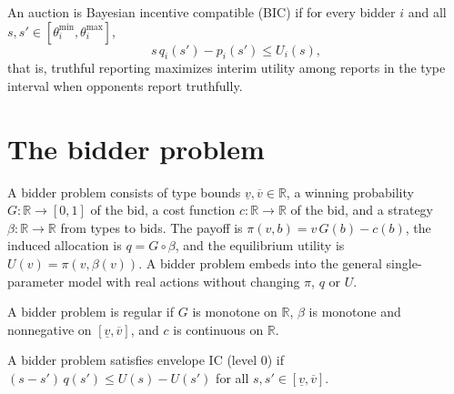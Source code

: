 \begin{definition}\label{def:MathEconLib.Auction.BIC}\leanok
{}
An auction is Bayesian incentive compatible (BIC) if for every bidder $i$ and all $s,s'\in[\theta^{\min}_i,\theta^{\max}_i]$,
\[
s\,q_i(s')-p_i(s')\le U_i(s),
\]
that is, truthful reporting maximizes interim utility among reports in the type interval when opponents report truthfully.
\end{definition}

\section{The bidder problem}

\begin{definition}\label{def:MathEconLib.BidderProblem}\leanok
{}
A bidder problem consists of type bounds $\underline v,\overline v\in\mathbb{R}$, a winning probability $G:\mathbb{R}\to[0,1]$ of the bid, a cost function $c:\mathbb{R}\to\mathbb{R}$ of the bid, and a strategy $\beta:\mathbb{R}\to\mathbb{R}$ from types to bids. The payoff is $\pi(v,b)=v\,G(b)-c(b)$, the induced allocation is $q=G\circ\beta$, and the equilibrium utility is $U(v)=\pi(v,\beta(v))$. A bidder problem embeds into the general single-parameter model with real actions without changing $\pi$, $q$ or $U$.
\end{definition}

\begin{definition}\label{def:MathEconLib.BidderProblem.IsRegular}\leanok
{}
A bidder problem is regular if $G$ is monotone on $\mathbb{R}$, $\beta$ is monotone and nonnegative on $[\underline v,\overline v]$, and $c$ is continuous on $\mathbb{R}$.
\end{definition}

\begin{definition}\label{def:MathEconLib.BidderProblem.HasEnvelopeIC}\leanok
{}
A bidder problem satisfies envelope IC (level $0$) if $(s-s')\,q(s')\le U(s)-U(s')$ for all $s,s'\in[\underline v,\overline v]$.
\end{definition}

